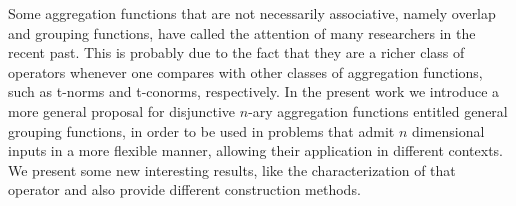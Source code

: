 
Some aggregation functions that are not necessarily associative, namely overlap and grouping functions, have called the attention of many researchers in the recent past. This is probably due to the fact that they are a richer class of operators whenever one compares with other classes of aggregation functions, such as t-norms and t-conorms, respectively. In the present work we introduce a more general proposal for disjunctive $n$-ary aggregation functions entitled general grouping functions, in order to be used in problems that admit $n$ dimensional inputs in a more flexible manner, allowing their application in different contexts. We present some new interesting results, like the characterization of that operator and also provide different construction methods.


